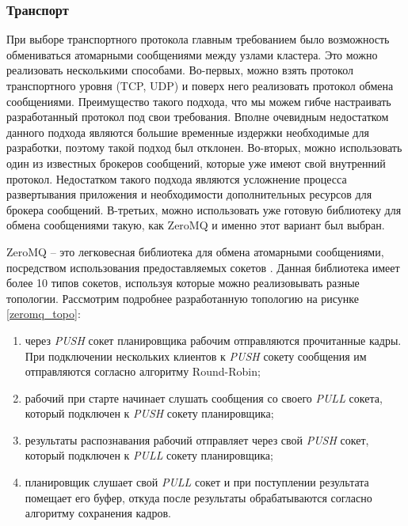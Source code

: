 \subsubsection{Транспорт}

При выборе транспортного протокола главным требованием было возможность обмениваться атомарными сообщениями между узлами
кластера. Это можно реализовать несколькими способами. Во-первых, можно взять протокол транспортного уровня (TCP, UDP)
и поверх него реализовать протокол обмена сообщениями. Преимущество такого подхода, что мы можем гибче настраивать разработанный
протокол под свои требования. Вполне очевидным недостатком данного подхода являются большие временные издержки необходимые 
для разработки, поэтому такой подход был отклонен. Во-вторых, можно использовать один из известных брокеров сообщений, 
которые уже имеют свой внутренний протокол. Недостатком такого подхода являются усложнение процесса развертывания 
приложения и необходимости дополнительных ресурсов для брокера сообщений. В-третьих, можно использовать уже готовую 
библиотеку для обмена сообщениями такую, как ZeroMQ и именно этот вариант был выбран.

ZeroMQ -- это легковесная библиотека для обмена атомарными сообщениями, посредством использования предоставляемых сокетов 
\cite{ZEROMQ}. Данная библиотека имеет более 10 типов сокетов, используя которые можно реализовывать разные топологии.
Рассмотрим подробнее разработанную топологию на рисунке \ref{zeromq_topo}:


\begin{enumerate}
\item через \emph{PUSH} сокет планировщика рабочим отправляются прочитанные кадры. При подключении нескольких клиентов к 
\emph{PUSH} сокету сообщения им отправляются согласно алгоритму Round-Robin;
\item рабочий при старте начинает слушать сообщения со своего \emph{PULL} сокета, который подключен к \emph{PUSH} сокету 
планировщика;
\item результаты распознавания рабочий отправляет через свой \emph{PUSH} сокет, который подключен к \emph{PULL} сокету 
планировщика;
\item планировщик слушает свой \emph{PULL} сокет и при поступлении результата помещает его буфер, откуда после результаты
обрабатываются согласно алгоритму сохранения кадров.
\end{enumerate}

